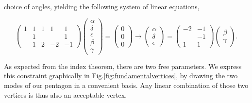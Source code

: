 \begin{appendices}
			choice of angles, yielding the following system of linear equations,
			
			\begin{equation}
				\begin{pmatrix}
					1 & 1 & 1 & 1 & 1\\
					 & 1 &  &  & 1\\
					 & 1 & 2 & -2 & -1
				\end{pmatrix}
				\begin{pmatrix}
					\alpha\\
					\delta\\
					\epsilon\\
					\beta\\
					\gamma
				\end{pmatrix}
				=\begin{pmatrix}
					0\\
					0\\
					0
				\end{pmatrix}
				\rightarrow
				\begin{pmatrix}
					\alpha\\
					\delta\\
					\epsilon
				\end{pmatrix}
				=
				\begin{pmatrix}
					-2 & -1\\
					   & -1\\
					 1 &  1
				\end{pmatrix}
				\begin{pmatrix}
					\beta\\
					\gamma
				\end{pmatrix}.
				\label{eq:trianglesystem}
			\end{equation}
			
			As expected from the index theorem, there are two free parameters. We express this constraint graphically in Fig.\ref{fig:fundamentalvertices}, by drawing the two modes of our pentagon in a convenient basis. Any linear combination of those two vertices is thus also an acceptable vertex.


				\begin{figure}[!ht]
				\centering{
				\scalebox{1.5}{
				\begin{tikzpicture}
        				
					\vertex
					
					\begin{scope}[xshift = 0.535cm, yshift=0.535cm, rotate = 180]
						\greenarrow
					\end{scope}
					\begin{scope}[xshift = 0.465cm, yshift=0.465cm, rotate = 180]
						\greenarrow
					\end{scope}
					

\end{tikzpicture}}}
\end{figure}
\end{appendices}
